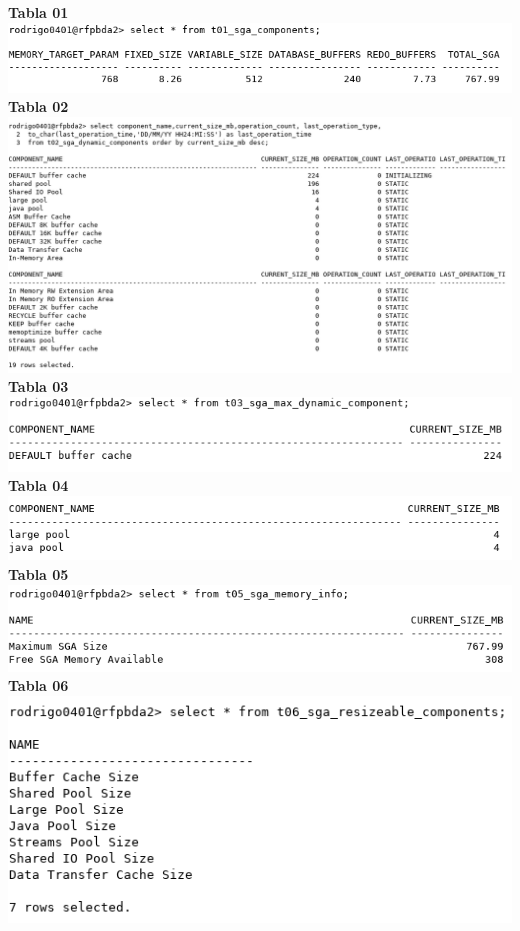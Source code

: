 \documentclass{article}
\begin{document}
\textbf{Tabla 01} \\
\includegraphics[width=0.8\linewidth]{t01} \\[5mm]
\newpage
\textbf{Tabla 02} \\
\includegraphics[width=\linewidth]{t02} \\[5mm]
\textbf{Tabla 03} \\
\includegraphics[width=0.8\linewidth]{t03} \\[5mm]
\textbf{Tabla 04} \\
\includegraphics[width=0.8\linewidth]{t04} \\[5mm]
\textbf{Tabla 05} \\
\includegraphics[width=0.8\linewidth]{t05} \\[5mm]
\textbf{Tabla 06} \\
\includegraphics[width=0.6\linewidth]{t06} \\[5mm]
\end{document}
